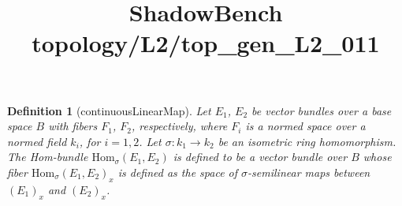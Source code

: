 \documentclass{article}
\title{ShadowBench topology/L2/top\_gen\_L2\_011}
\newtheorem{definition}{Definition}
\begin{document}
\maketitle

\begin{definition}[continuousLinearMap]
    Let $E_1$, $E_2$ be vector bundles over a base space $B$ with fibers $F_1$, $F_2$, respectively, where $F_i$ is a normed space over a normed field $k_i$, for $i=1,2$. Let $\sigma: k_1 \to k_2$ be an isometric ring homomorphism. The Hom-bundle $\text{Hom}_\sigma (E_1,E_2)$ is defined to be a vector bundle over $B$ whose fiber $\text{Hom}_\sigma (E_1,E_2)_x$ is defined as the space of $\sigma$-semilinear maps between $(E_1)_x$ and $(E_2)_x$.
\end{definition}
\end{document}
